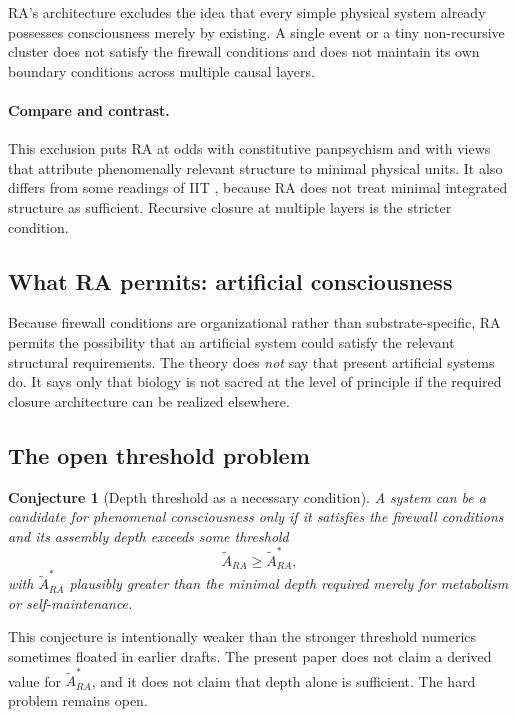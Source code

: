\documentclass[11pt]{article}
\def\mathrm#1{#1}%
\newtheorem{conjecture}{Conjecture}
\begin{document}
RA's architecture excludes the idea that every simple physical system already possesses consciousness merely by existing. A single event or a tiny non-recursive cluster does not satisfy the firewall conditions and does not maintain its own boundary conditions across multiple causal layers.

\paragraph{Compare and contrast.} This exclusion puts RA at odds with constitutive panpsychism and with views that attribute phenomenally relevant structure to minimal physical units. It also differs from some readings of IIT \cite{Tononi2016}, because RA does not treat minimal integrated structure as sufficient. Recursive closure at multiple layers is the stricter condition.

\subsection{What RA permits: artificial consciousness}

Because firewall conditions are organizational rather than substrate-specific, RA permits the possibility that an artificial system could satisfy the relevant structural requirements. The theory does \emph{not} say that present artificial systems do. It says only that biology is not sacred at the level of principle if the required closure architecture can be realized elsewhere.

\subsection{The open threshold problem}

\begin{conjecture}[Depth threshold as a necessary condition]
A system can be a candidate for phenomenal consciousness only if it satisfies the firewall conditions and its assembly depth exceeds some threshold
\[
\tilde{A}_{\mathrm{RA}} \ge \tilde{A}_{\mathrm{RA}}^{\ast},
\]
with $\tilde{A}_{\mathrm{RA}}^{\ast}$ plausibly greater than the minimal depth required merely for metabolism or self-maintenance.
\end{conjecture}

This conjecture is intentionally weaker than the stronger threshold numerics sometimes floated in earlier drafts. The present paper does not claim a derived value for $\tilde{A}_{\mathrm{RA}}^{\ast}$, and it does not claim that depth alone is sufficient. The hard problem remains open.
\end{document}

